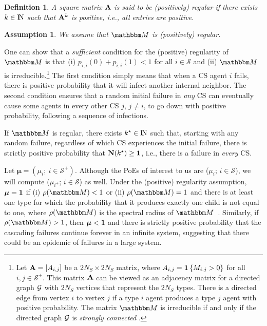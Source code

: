 \documentclass[10pt, journal, compsoc]{IEEEtran}
\newcommand {\cS}{{\mathcal{S}}}
\newcommand {\bM} {{\mathbbm M}}
\newcommand {\bN} {{\bf N}}
\newcommand {\N} {{\rm I\kern-1.5pt N}}
\newtheorem{defn}{Definition}%
\newtheorem{assm}{Assumption}%
\newcommand{\indicate}[1]{{\bf{1}} \left\{#1\right\}}
\newcommand{\myskip}{\\ \vspace{-0.1in}}
\begin{document}
\begin{defn}	\label{def:pos-regular}
A square matrix ${\bf A}$ is said to be 
{\em (positively) regular} if there exists
$k \in \N$ such that ${\bf A}^k$ is
positive, i.e., all entries are positive. 
\end{defn}


\begin{assm}	\label{assm:pos-regular}
We assume that $\bM$ is (positively) regular.
\myskip
\end{assm}

One can show that a {\em sufficient} condition 
for the (positive)
regularity of $\bM$ is that (i) $p_{i,i}(0) + 
p_{i,i}(1) < 1$
for all $i \in \cS$ and (ii) $\bM$ is 
irreducible.\footnote{Let ${\bf A} = 
[A_{i,j}]$ be a $2 N_S \times 2 N_S$ matrix, 
where $A_{i,j} = \indicate{M_{i,j} > 0}$ for 
all $i, j \in \cS^+$. This matrix ${\bf A}$ 
can be viewed as an adjacency matrix for a 
directed graph ${\cal G}$ with $2 N_S$ 
vertices that represent the $2 N_S$ types. 
There is a directed edge from vertex $i$
to vertex $j$ if a type $i$ agent produces
a type $j$ agent with positive probability. 
The matrix $\bM$ is irreducible if
and only if the directed graph 
${\cal G}$ is {\em strongly connected}
\cite{AGT}.} 
The first condition simply
means that when a CS agent $i$ fails, 
there is positive probability that it will
infect another internal neighbor. 
The second condition ensures that a random 
initial failure
in {\em any} CS can eventually cause
some agents in every other CS $j$, $j \neq
i$, to go down with positive probability,
following a sequence of infections. 

If $\bM$ is regular, there exists
$k^\star \in \N$ such that, starting with any 
random failure, regardless of which CS
experiences the initial failure, there is
strictly positive probability that 
$\bN(k^\star) \geq {\bf 1}$, i.e., there is
a failure in {\em every} CS. 

Let $\boldsymbol{\mu} = (\mu_i; \ i \in 
\cS^+)$. Although 
the PoEs of interest to us are ($\mu_i$; 
$i \in \cS$), we will compute ($\mu_{i^+}$;
$i \in \cS$) as well.
Under the (positive) regularity assumption, 
$\boldsymbol{\mu} = {\bf 1}$ if (i) $\rho(\bM)
< 1$ or (ii) $\rho(\bM) = 1$ and there is
at least one type for which the probability 
that it produces 
exactly one child is not equal to one, 
where $\rho(\bM)$ is the spectral
radius of $\bM$~\cite{matrix}. Similarly, 
if $\rho(\bM) > 1$, then $\boldsymbol{\mu}
< {\bf 1}$ and there is strictly positive
probability that the cascading failures  
continue forever in an infinite system, suggesting
that there could be an epidemic of failures
in a large system.
\end{document}
